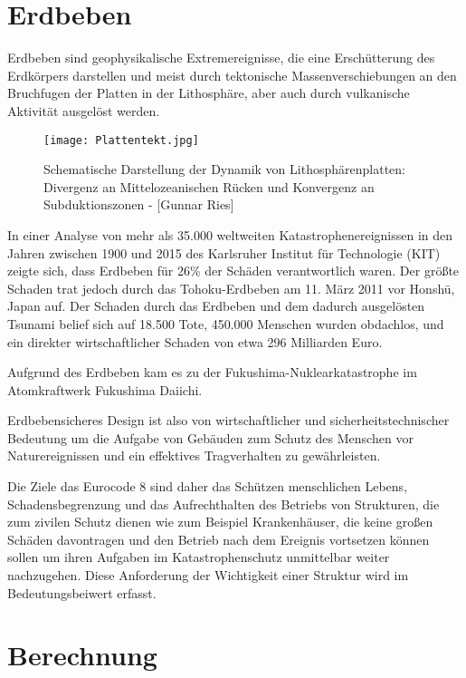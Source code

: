 \section{Erdbeben}
\label{sec:erdbeben}

Erdbeben sind geophysikalische Extremereignisse, die eine Erschütterung des Erdkörpers darstellen und meist durch tektonische Massenverschiebungen an den Bruchfugen der Platten in der Lithosphäre, aber auch durch vulkanische Aktivität ausgelöst werden. \cite{ETHZ}

\begin{figure}[ht]
    \centering
    \texttt{[image: Plattentekt.jpg]}
    \caption{Schematische Darstellung der Dynamik von Lithosphärenplatten: Divergenz an Mittelozeanischen Rücken und Konvergenz an Subduktionszonen - [Gunnar Ries]}
\end{figure}

In einer Analyse von mehr als 35.000 weltweiten Katastrophenereignissen in den Jahren zwischen 1900 und 2015 des Karlsruher Institut für Technologie (KIT) zeigte sich, dass Erdbeben für 26\% der Schäden verantwortlich waren.
Der größte Schaden trat jedoch durch das Tohoku-Erdbeben am 11. März 2011 vor Honshū, Japan auf. Der Schaden durch das Erdbeben und dem dadurch ausgelösten Tsunami belief sich auf 18.500 Tote, 450.000 Menschen wurden obdachlos, und ein direkter wirtschaftlicher Schaden von etwa 296 Milliarden Euro. \cite{DANIELL}

Aufgrund des Erdbeben kam es zu der Fukushima-Nuklearkatastrophe im Atomkraftwerk Fukushima Daiichi.

Erdbebensicheres Design ist also von wirtschaftlicher und sicherheitstechnischer Bedeutung um die Aufgabe von Gebäuden zum Schutz des Menschen vor Naturereignissen und ein effektives Tragverhalten zu gewährleisten.

Die Ziele das Eurocode 8 sind daher das Schützen menschlichen Lebens, Schadensbegrenzung und das Aufrechthalten des Betriebs von Strukturen, die zum zivilen Schutz dienen wie zum Beispiel Krankenhäuser, die keine großen Schäden davontragen und den Betrieb nach dem Ereignis vortsetzen können sollen um ihren Aufgaben im Katastrophenschutz unmittelbar weiter nachzugehen.
Diese Anforderung der Wichtigkeit einer Struktur wird im Bedeutungsbeiwert erfasst. \cite{EC8}

\pagebreak

\section{Berechnung}
\label{sec:berechnung}

